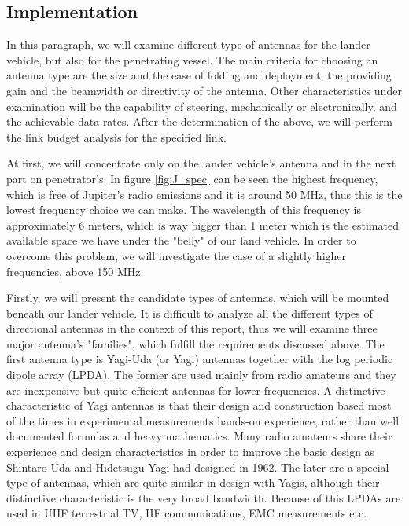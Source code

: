 
\subsection{Implementation}
In this paragraph, we will examine different type of antennas for the lander vehicle, but also for the penetrating vessel. The main criteria for choosing an antenna type are the size and the ease of folding and deployment, the providing gain and the beamwidth or directivity of the antenna. Other characteristics under examination will be the capability of steering, mechanically or electronically, and the achievable data rates. After the determination of the above, we will perform the link budget analysis for the specified link. 

At first, we will concentrate only on the lander vehicle's antenna and in the next part on penetrator's. In figure \ref{fig:J_spec} can be seen the highest frequency, which is free of Jupiter's radio emissions and it is around 50 MHz, thus this is the lowest frequency choice we can make. The wavelength of this frequency is approximately 6 meters, which is way bigger than 1 meter which is the estimated available space we have under the "belly" of our land vehicle. In order to overcome this problem, we will investigate the case of a slightly higher frequencies, above 150 MHz. 

Firstly, we will present the candidate types of antennas, which will be mounted beneath our lander vehicle. It is difficult to analyze all the different types of directional antennas in the context of this report, thus we will examine three major antenna's "families", which fulfill the requirements discussed above. The first antenna type is Yagi-Uda (or Yagi) antennas together with the log periodic dipole array (LPDA). The former are used mainly from radio amateurs and they are inexpensive but quite efficient antennas for lower frequencies. A distinctive characteristic of Yagi antennas is that their design and construction based most of the times in experimental measurements hands-on experience, rather than well documented formulas and heavy mathematics. Many radio amateurs share their experience and design characteristics in order to improve the basic design as Shintaro Uda and Hidetsugu Yagi had designed in 1962. The later are a special type of antennas, which are quite similar in design with Yagis, although their distinctive characteristic is the very broad bandwidth. Because of this LPDAs are used in UHF terrestrial TV, HF communications, EMC measurements etc.

